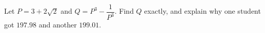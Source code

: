 Let $P=3+2\sqrt2$ and $Q=P^3-\dfrac1{P^3}$. Find $Q$ exactly, and explain why one student got $197.98$ and another $199.01$.
